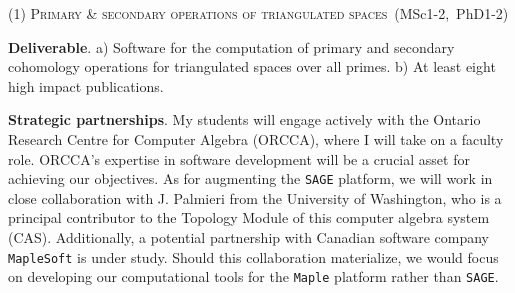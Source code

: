 
\smallskip
{\centering (1) \textsc{Primary \& secondary operations of triangulated spaces}~(MSc1-2,~PhD1-2)\par}

\smallskip\textbf{Deliverable}.
a) Software for the computation of primary and secondary cohomology operations for triangulated spaces over all primes.
b) At least eight high impact publications.

\smallskip\textbf{Strategic partnerships}.
My students will engage actively with the Ontario Research Centre for Computer Algebra (ORCCA), where I will take on a faculty role.
ORCCA's expertise in software development will be a crucial asset for achieving our objectives.
As for augmenting the \texttt{SAGE} platform, we will work in close collaboration with J. Palmieri from the University of Washington, who is a principal contributor to the Topology Module of this computer algebra system (CAS).
Additionally, a potential partnership with Canadian software company \texttt{MapleSoft} is under study.
Should this collaboration materialize, we would focus on developing our computational tools for the \texttt{Maple} platform rather than \texttt{SAGE}.


